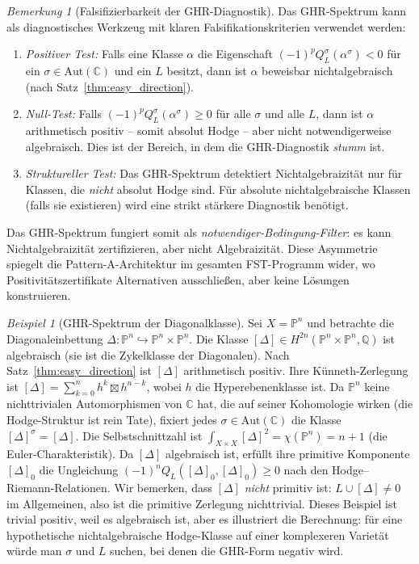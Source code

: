 \documentclass[aps,prd,twocolumn,superscriptaddress,nofootinbib]{revtex4-2}
\theoremstyle{definition}
\theoremstyle{remark}
\newtheorem{remark}[theorem]{Bemerkung}
\newtheorem{example}[theorem]{Beispiel}
\begin{document}
\begin{remark}[Falsifizierbarkeit der GHR-Diagnostik]
\label{rem:ghr-falsifiability}
Das GHR-Spektrum kann als diagnostisches Werkzeug mit klaren Falsifikationskriterien verwendet werden:
\begin{enumerate}
\item \emph{Positiver Test:} Falls eine Klasse $\alpha$ die Eigenschaft $(-1)^p Q_L^\sigma(\alpha^\sigma) < 0$ für ein $\sigma \in \mathrm{Aut}(\mathbb{C})$ und ein $L$ besitzt, dann ist $\alpha$ beweisbar nichtalgebraisch (nach Satz~\ref{thm:easy_direction}).
\item \emph{Null-Test:} Falls $(-1)^p Q_L^\sigma(\alpha^\sigma) \geq 0$ für alle $\sigma$ und alle $L$, dann ist $\alpha$ arithmetisch positiv -- somit absolut Hodge -- aber nicht notwendigerweise algebraisch. Dies ist der Bereich, in dem die GHR-Diagnostik \emph{stumm} ist.
\item \emph{Struktureller Test:} Das GHR-Spektrum detektiert Nichtalgebraizität nur für Klassen, die \emph{nicht} absolut Hodge sind. Für absolute nichtalgebraische Klassen (falls sie existieren) wird eine strikt stärkere Diagnostik benötigt.
\end{enumerate}
Das GHR-Spektrum fungiert somit als \emph{notwendiger-Bedingung-Filter}: es kann Nichtalgebraizität zertifizieren, aber nicht Algebraizität. Diese Asymmetrie spiegelt die Pattern-A-Architektur im gesamten FST-Programm wider, wo Positivitätszertifikate Alternativen ausschließen, aber keine Lösungen konstruieren.
\end{remark}

\begin{example}[GHR-Spektrum der Diagonalklasse]
\label{ex:diagonal}
Sei $X = \mathbb{P}^n$ und betrachte die Diagonaleinbettung $\Delta: \mathbb{P}^n \hookrightarrow \mathbb{P}^n \times \mathbb{P}^n$. Die Klasse $[\Delta] \in H^{2n}(\mathbb{P}^n \times \mathbb{P}^n, \mathbb{Q})$ ist algebraisch (sie ist die Zykelklasse der Diagonalen). Nach Satz~\ref{thm:easy_direction} ist $[\Delta]$ arithmetisch positiv. Ihre Künneth-Zerlegung ist $[\Delta] = \sum_{k=0}^n h^k \boxtimes h^{n-k}$, wobei $h$ die Hyperebenenklasse ist. Da $\mathbb{P}^n$ keine nichttrivialen Automorphismen von $\mathbb{C}$ hat, die auf seiner Kohomologie wirken (die Hodge-Struktur ist rein Tate), fixiert jedes $\sigma \in \mathrm{Aut}(\mathbb{C})$ die Klasse $[\Delta]^\sigma = [\Delta]$. Die Selbstschnittzahl ist $\int_{X \times X} [\Delta]^2 = \chi(\mathbb{P}^n) = n + 1$ (die Euler-Charakteristik). Da $[\Delta]$ algebraisch ist, erfüllt ihre primitive Komponente $[\Delta]_0$ die Ungleichung $(-1)^n Q_L([\Delta]_0, [\Delta]_0) \geq 0$ nach den Hodge--Riemann-Relationen. Wir bemerken, dass $[\Delta]$ \emph{nicht} primitiv ist: $L \cup [\Delta] \neq 0$ im Allgemeinen, also ist die primitive Zerlegung nichttrivial. Dieses Beispiel ist \glqq trivial positiv\grqq{}, weil es algebraisch ist, aber es illustriert die Berechnung: für eine hypothetische nichtalgebraische Hodge-Klasse auf einer komplexeren Varietät würde man $\sigma$ und $L$ suchen, bei denen die GHR-Form negativ wird.
\end{example}
\end{document}
